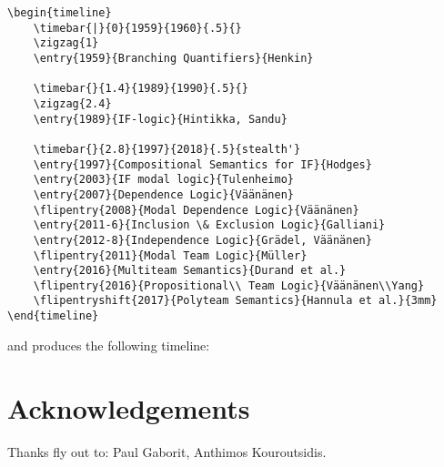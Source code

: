 \documentclass{article}
\begin{document}
\begin{lstlisting}
\begin{timeline}
 	\timebar{|}{0}{1959}{1960}{.5}{}
	\zigzag{1}
	\entry{1959}{Branching Quantifiers}{Henkin}
  	
	\timebar{}{1.4}{1989}{1990}{.5}{}
	\zigzag{2.4}
	\entry{1989}{IF-logic}{Hintikka, Sandu}

	\timebar{}{2.8}{1997}{2018}{.5}{stealth'}
	\entry{1997}{Compositional Semantics for IF}{Hodges}
	\entry{2003}{IF modal logic}{Tulenheimo}
	\entry{2007}{Dependence Logic}{Väänänen}
	\flipentry{2008}{Modal Dependence Logic}{Väänänen}
	\entry{2011-6}{Inclusion \& Exclusion Logic}{Galliani}
	\entry{2012-8}{Independence Logic}{Grädel, Väänänen}
	\flipentry{2011}{Modal Team Logic}{Müller}
	\entry{2016}{Multiteam Semantics}{Durand et al.}
	\flipentry{2016}{Propositional\\ Team Logic}{Väänänen\\Yang}
	\flipentryshift{2017}{Polyteam Semantics}{Hannula et al.}{3mm}
\end{timeline}
\end{lstlisting}
and produces the following timeline:


	\begin{timeline}
	  	
	
  	\end{timeline}

\section{Acknowledgements}
Thanks fly out to: Paul Gaborit, Anthimos Kouroutsidis.
\end{document}
